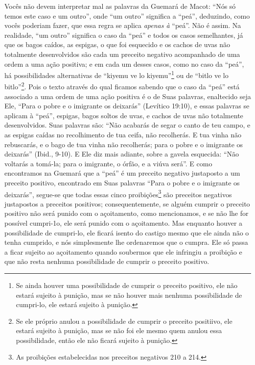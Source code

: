 Vocês não devem interpretar mal as palavras da Guemará de Macot: ``Nós
só temos este caso e um outro'', onde ``um outro'' significa a ``peá'',
deduzindo, como vocês poderiam fazer, que essa regra se aplica
\emph{apenas à} ``peá''. Não é assim. Na realidade, ``um outro''
significa o caso da ``peá'' e todos os casos semelhantes, já que os
bagos caídos, as espigas, o que foi esquecido e os cachos de uvas não
totalmente desenvolvidos são cada um preceito negativo acompanhado de
uma ordem a uma ação positiva; e em cada um desses casos, como no caso
da ``peá'', há possibilidades alternativas de ``kiyemu ve lo
kiyemu''\footnote{Se ainda houver uma possibilidade de cumprir o preceito positivo, ele
  não estará sujeito à punição, mas se não houver mais nenhuma
  possibilidade de cumpri-lo, ele estará sujeito à punição.} ou de ``bitlo ve lo
bitlo''\footnote{Se ele próprio anulou a possibilidade de cumprir o preceito
  positiivo, ele estará sujeito à punição, mas se não foi ele mesmo
  quem anulou essa possibilidade, então ele não ficará sujeito à
  punição.}. Pois o texto através do qual ficamos
sabendo que o caso da ``peá'' está associado a uma ordem de uma ação
positiva é o de Suas palavras, enaltecido seja Ele, ``Para o pobre e o
imigrante os deixarás'' (Levítico 19:10), e essas palavras se aplicam à
``peá'', espigas, bagos soltos de uvas, e cachos de uvas não totalmente
desenvolvidos. Suas palavras são: ``Não acabarás de segar o canto de teu
campo, e as espigas caídas no recolhimento de tua ceifa, não recolherás.
E tua vinha não rebuscarás, e o bago de tua vinha não recolherás; para
o pobre e o imigrante os deixarás'' (Ibid., 9-10). E Ele diz mais
adiante, sobre a gavela esquecida: ``Não voltarás a tomá-la; para o
imigrante, o órfão, e a viúva será''. E como encontramos na Guemará que
a ``peá'' é um preceito negativo justaposto a um preceito positivo,
encontrado em Suas palavras ``Para o pobre e o imigrante os deixarás'',
segue-se que todas essas cinco proibições\footnote{As proibições estabelecidas nos preceitos negativos 210 a 214.} são
preceitos negativos justapostos a preceitos positivos;
consequentemente, se alguém cumprir o preceito positivo não será punido
com o açoitamento, como mencionamos, e se não lhe for possível
cumpri-1o, ele será punido com o açoitamento. Mas enquanto houver a
possibilidade de cumpri-lo, ele ficará isento do castigo mesmo que ele
ainda não o tenha cumprido, e nós simplesmente lhe ordenaremos que o
cumpra. Ele só passa a ficar sujeito ao açoitamento quando soubermos
que ele infringiu a proibição e que não resta nenhuma possibilidade de
cumprir o preceito positivo.

